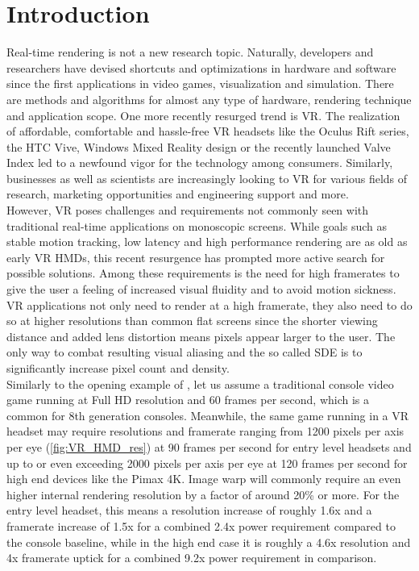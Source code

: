 
\chapter{Introduction}
Real-time rendering is not a new research topic. Naturally,  developers and researchers have devised shortcuts and optimizations in hardware and software since the first applications in video games, visualization and simulation. There are methods and algorithms for almost any type of hardware, rendering technique and application scope. 
One more recently resurged trend is \gls{VR}. The realization of  affordable, comfortable and hassle-free \gls{VR} headsets like the Oculus Rift series, the HTC Vive, Windows Mixed Reality design or the recently launched Valve Index led to a newfound vigor for the technology among consumers. Similarly, businesses as well as scientists are increasingly looking to \gls{VR} for various fields of research, marketing opportunities and engineering support and more. \\
However, \gls{VR} poses challenges and requirements not commonly seen with traditional real-time applications on monoscopic screens.  While goals such as stable motion tracking, low latency and high performance rendering are as old as early \gls{VR} \gls{HMD}s, this recent resurgence has prompted more active search for possible solutions. Among these requirements is the need for high framerates to give the user a feeling of increased visual fluidity and to avoid motion sickness. \gls{VR} applications not only need to render at a high framerate, they also need to do so at higher resolutions than common flat screens since the shorter viewing distance and added lens distortion means pixels appear larger to the user. The only way to combat resulting visual aliasing and the so called \gls{SDE} is to significantly increase pixel count and density. \\

Similarly to the opening example of \cite{InigoQuilez.2017}, let us assume a traditional console video game running at Full HD resolution and 60 frames per second, which is a common for 8th generation consoles. Meanwhile, the same game running in a VR headset may require resolutions and framerate ranging from 1200 pixels per axis per eye (\autoref{fig:VR_HMD_res}) at 90 frames per second for entry level headsets and up to or even exceeding 2000 pixels per axis per eye at 120 frames per second for high end devices like the Pimax 4K. Image warp will commonly require an even higher internal rendering resolution by a factor of around 20\% or more. For the entry level headset, this means a resolution increase of roughly 1.6x and a framerate increase of 1.5x for a combined 2.4x power requirement compared to the console baseline, while in the high end case it is roughly a 4.6x resolution and 4x framerate uptick for a combined 9.2x power requirement in comparison. \\

